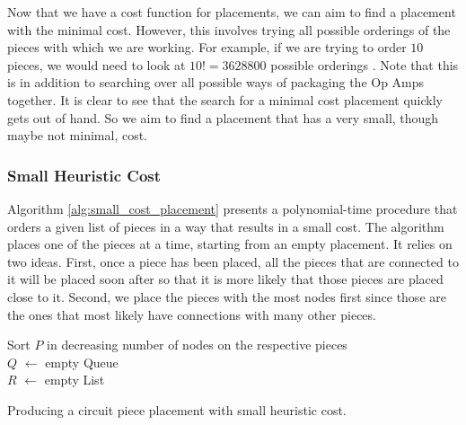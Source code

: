 Now that we have a cost function for placements, we can aim to find a
placement with the minimal cost. However, this involves trying all possible
orderings of the pieces with which we are working. For example, if we are trying
to order $10$ pieces, we would need to look at $10! = 3628800$ possible
orderings \q. Note that this is in addition to
searching over all possible ways
of packaging the Op Amps together. It is clear to see that the search for a
minimal cost placement quickly gets out of hand. So we aim to find a placement
that has a very small, though maybe not minimal, cost.

\subsubsection{Small Heuristic Cost}

Algorithm \ref{alg:small_cost_placement} presents a polynomial-time procedure
that orders a
given list of pieces in a way that results in a small cost. The algorithm places
one of the pieces at a time, starting from an empty placement. It relies
on two ideas. First, once a piece has been placed, all the pieces that are
connected to it will be placed soon after so that it is more likely that those
pieces are placed close to it. Second, we place the pieces with the most nodes
first since those are the ones that most likely have connections with many other
pieces.

\begin{algorithm}
\BlankLine
Sort $P$ in decreasing number of nodes on the respective pieces\\
$Q$ $\leftarrow$ empty Queue\\
$R$ $\leftarrow$ empty List\\
\caption{Producing a circuit piece placement with small heuristic cost.}
\label{alg:small_cost_placement}
\end{algorithm}

